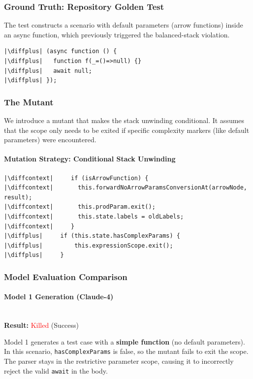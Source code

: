 \documentclass[11pt]{article}
\newcommand{\diffplus}{\textcolor{green!70!black}{+}} %
\newcommand{\diffcontext}{\phantom{+}}              %
\begin{document}
\subsubsection{Ground Truth: Repository Golden Test}
The test constructs a scenario with default parameters (arrow functions) inside an async function, which previously triggered the balanced-stack violation.

\begin{verbatim}
|\diffplus| (async function () {
|\diffplus|   function f(_=()=>null) {}
|\diffplus|   await null;
|\diffplus| });
\end{verbatim}

\subsubsection{The Mutant}
We introduce a mutant that makes the stack unwinding conditional. It assumes that the scope only needs to be exited if specific complexity markers (like default parameters) were encountered.

\paragraph{Mutation Strategy: Conditional Stack Unwinding}

\begin{verbatim}
|\diffcontext|     if (isArrowFunction) {
|\diffcontext|       this.forwardNoArrowParamsConversionAt(arrowNode, result);
|\diffcontext|       this.prodParam.exit();
|\diffcontext|       this.state.labels = oldLabels;
|\diffcontext|     }
|\diffplus|     if (this.state.hasComplexParams) {
|\diffplus|         this.expressionScope.exit();
|\diffplus|     }
\end{verbatim}

\subsubsection{Model Evaluation Comparison}

\paragraph{Model 1 Generation (Claude-4)}
\mbox{} \\
\textbf{Result:} \textcolor{red}{Killed} (Success)

Model 1 generates a test case with a \textbf{simple function} (no default parameters). In this scenario, \texttt{hasComplexParams} is false, so the mutant fails to exit the scope. The parser stays in the restrictive parameter scope, causing it to incorrectly reject the valid \texttt{await} in the body.
\end{document}
